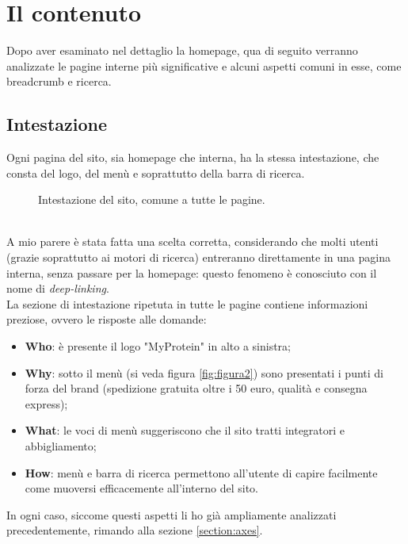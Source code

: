 \section{Il contenuto}
Dopo aver esaminato nel dettaglio la homepage, qua di seguito verranno analizzate le pagine interne più significative e alcuni aspetti comuni in esse, come breadcrumb e ricerca. 

\subsection{Intestazione}
Ogni pagina del sito, sia homepage che interna, ha la stessa intestazione, che consta del logo, del menù e soprattutto della barra di ricerca.
\begin{figure}[!htb]
	\caption{\label{fig:figura5}} Intestazione del sito, comune a tutte le pagine.
\end{figure} \\
A mio parere è stata fatta una scelta corretta, considerando che molti utenti (grazie soprattutto ai motori di ricerca) entreranno direttamente in una pagina interna, senza passare per la homepage: questo fenomeno è conosciuto con il nome di \textit{deep-linking}.\\
La sezione di intestazione ripetuta in tutte le pagine contiene informazioni preziose, ovvero le risposte alle domande:
\begin{itemize}
	\item \textbf{Who}: è presente il logo "MyProtein" in alto a sinistra;
	\item \textbf{Why}: sotto il menù (si veda figura \ref{fig:figura2}) sono presentati i punti di forza del brand (spedizione gratuita oltre i 50 euro, qualità e consegna express);
	\item \textbf{What}: le voci di menù suggeriscono che il sito tratti integratori e abbigliamento;
	\item \textbf{How}: menù e barra di ricerca permettono all'utente di capire facilmente come muoversi efficacemente all'interno del sito. 
\end{itemize}
In ogni caso, siccome questi aspetti li ho già ampliamente analizzati precedentemente, rimando alla sezione \ref{section:axes}.


